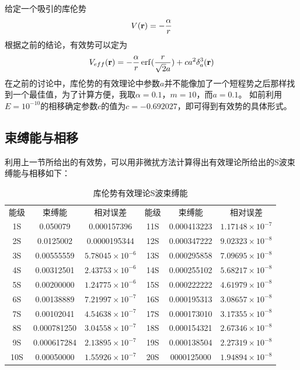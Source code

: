 \documentclass[hyperref,cs4size,titlepage,twoside]{ctexart}
\begin{document}
给定一个吸引的库伦势
\begin{equation}
  V(\vb{r})=-\frac{\alpha}{r}
\end{equation}
根据之前的结论，有效势可以定为
\begin{equation}
  V_{eff}(\vb{r})=-\frac{\alpha}{r}\erf(\frac{r}{\sqrt{2}a})+c a^2\delta_a^3(\vb{r})
\end{equation}
在之前的讨论中，库伦势的有效理论中参数$a$并不能像加了一个短程势之后那样找到一个最佳值，为了计算方便，我取$\alpha=0.1$，$m=10$，而$a=0.1$。
如前利用$E=10^{-10}$的相移确定参数$c$的值为$c=-0.692027$，即可得到有效势的具体形式。
\subsection{束缚能与相移}
利用上一节所给出的有效势，可以用非微扰方法计算得出有效理论所给出的S波束缚能与相移如下：
\begin{table}[!htbp]
  \centering
  \begin{tabular}{|cccccc|}
    \hline
    能级 & 束缚能 & 相对误差 & 能级 & 束缚能 & 相对误差 \\
    1S & 0.050079 & 0.000157396 & 11S & 0.000413223 & $1.17148\times10^{-7}$ \\
    2S & 0.0125002 & 0.0000195344 & 12S & 0.000347222 & $9.02323\times10^{-8}$ \\
    3S & 0.00555559 & $5.78045\times10^{-6}$ & 13S & 0.000295858 & $7.09695\times10^{-8}$ \\
    4S & 0.00312501 & $2.43753\times10^{-6}$ & 14S & 0.000255102 & $5.68217\times10^{-8}$ \\
    5S & 0.00200000 & $1.24775\times10^{-6}$ & 15S & 0.000222222 & $4.61979\times10^{-8}$ \\
    6S & 0.00138889 & $7.21997\times10^{-7}$ & 16S & 0.000195313 & $3.08657\times10^{-8}$ \\
    7S & 0.00102041 & $4.54638\times10^{-7}$ & 17S & 0.000173010 & $3.17355\times10^{-8}$ \\
    8S & 0.000781250 & $3.04558\times10^{-7}$ & 18S & 0.000154321 & $2.67346\times10^{-8}$ \\
    9S & 0.000617284 & $2.13895\times10^{-7}$ & 19S & 0.000138504 & $2.27319\times10^{-8}$ \\
    10S & 0.00050000 & $1.55926\times10^{-7}$ & 20S & 0000125000 & $1.94894\times10^{-8}$ \\
    \hline
  \end{tabular}
  \caption{库伦势有效理论S波束缚能}
\end{table}
\end{document}
